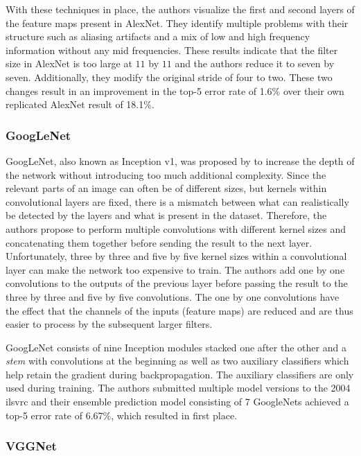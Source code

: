 \documentclass[draft,final]{vutinfth} %
\begin{document}
With these techniques in place, the authors visualize the first and
second layers of the feature maps present in AlexNet. They identify
multiple problems with their structure such as aliasing artifacts and
a mix of low and high frequency information without any mid
frequencies. These results indicate that the filter size in AlexNet is
too large at $11$ by $11$ and the authors reduce it to seven by
seven. Additionally, they modify the original stride of four to
two. These two changes result in an improvement in the top-5 error
rate of 1.6\% over their own replicated AlexNet result of 18.1\%.

\subsubsection{GoogLeNet}
\label{sssec:theory-googlenet}

GoogLeNet, also known as Inception v1, was proposed by
\textcite{szegedy2015} to increase the depth of the network without
introducing too much additional complexity. Since the relevant parts
of an image can often be of different sizes, but kernels within
convolutional layers are fixed, there is a mismatch between what can
realistically be detected by the layers and what is present in the
dataset. Therefore, the authors propose to perform multiple
convolutions with different kernel sizes and concatenating them
together before sending the result to the next layer. Unfortunately,
three by three and five by five kernel sizes within a convolutional
layer can make the network too expensive to train. The authors add one
by one convolutions to the outputs of the previous layer before
passing the result to the three by three and five by five
convolutions. The one by one convolutions have the effect that the
channels of the inputs (feature maps) are reduced and are thus easier
to process by the subsequent larger filters.

GoogLeNet consists of nine Inception modules stacked one after the
other and a \emph{stem} with convolutions at the beginning as well as
two auxiliary classifiers which help retain the gradient during
backpropagation. The auxiliary classifiers are only used during
training. The authors submitted multiple model versions to the 2004
\gls{ilsvrc} and their ensemble prediction model consisting of 7
GoogleNets achieved a top-5 error rate of 6.67\%, which resulted in
first place.

\subsubsection{VGGNet}
\label{sssec:theory-vggnet}
\end{document}
